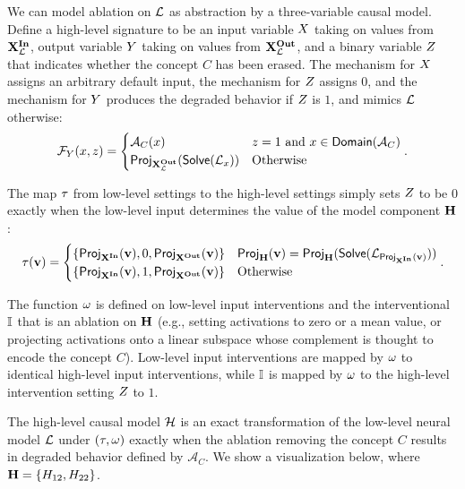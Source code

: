 \documentclass[twoside,11pt]{article}
\begin{document}
We can model ablation on $\lowmodel$ as abstraction by a three-variable causal model. Define a high-level signature to be an input variable $\onevar$ taking on values from $\inputvars_{\lowmodel}$, output variable $\onevarr$ taking on values from $\outputvars_{\lowmodel}$, and a binary variable $\onevarrr$ that indicates whether the concept $C$ has been erased. The mechanism for $\onevar$ assigns an arbitrary default input, the mechanism for $\onevarrr$ assigns $0$, and the mechanism for $\onevarr$ produces the degraded behavior if $\onevarrr$ is $1$, and mimics $\lowmodel$ otherwise:
\[ \mechanism{\onevarr}(\oneval, \onevalll) = \begin{cases}
\mathcal{A}_{C}(\oneval) & \onevalll = 1 \text{ and } \oneval \in \dom(\mathcal{A}_C)\\
\project{\sols(\lowmodel_{\oneval})}{\outputvars_{\lowmodel}} & \text{Otherwise}\\
\end{cases}.\]

The map $\setmap$ from low-level settings to the high-level settings simply sets $\onevarrr$ to be $0$ exactly when the low-level input determines the value of the model component $\hiddenneurons$:
\[\setmap(\tset) = \begin{cases} 
\{\project{\tset}{\inputvars}, 0,\project{\tset}{\outputvars} \} &  \project{\tset}{ \hiddenneurons} = \project{\sols(\lowmodel_{\project{\tset}{\inputvars}})}{\hiddenneurons} \\ 
\{\project{\tset}{\inputvars}, 1,\project{\tset}{\outputvars} \} & \text{Otherwise} \\
\end{cases}.\]

The function $\intmap$ is defined on low-level input interventions and the interventional $\intal$ that is an ablation on $\hiddenneurons$ (e.g., setting activations to zero or a mean value, or projecting activations onto a linear subspace whose complement is thought to encode the concept $C$). Low-level input interventions are mapped by $\intmap$ to identical high-level input interventions, while $\intal$ is mapped by $\intmap$ to the high-level intervention setting $\onevarrr$ to $1$.

The high-level causal model $\highmodel$ is an exact transformation of the low-level neural model $\lowmodel$ under $(\setmap, \intmap)$ exactly when the ablation removing the concept $C$ results in degraded behavior defined by $\mathcal{A}_{C}$. We show a visualization below, where $\hiddenneurons = \{\hiddenneuron_{12}, \hiddenneuron_{22} \}$.
\end{document}

